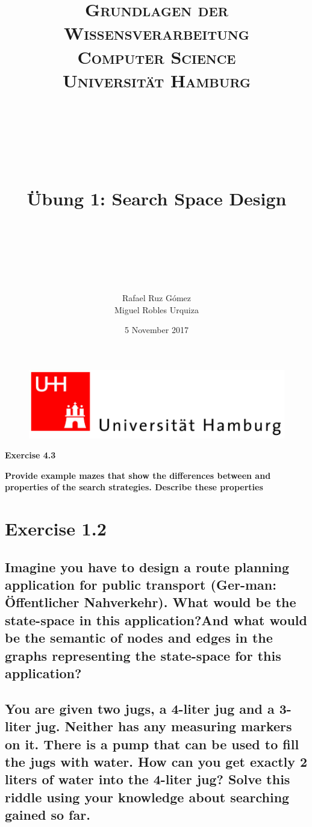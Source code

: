\documentclass[paper=a4, fontsize=11pt]{scrartcl} %
\title{	
\normalfont \normalsize 
\textsc{\textbf{Grundlagen der Wissensverarbeitung} \\ Computer Science \\ Universität Hamburg} \\ [25pt] %
~\\
~\\
~\\
\horrule{0.5pt} \\[0.4cm] %
\Huge Übung 1: Search Space Design \\ %
\horrule{2pt} \\[0.5cm] %
~\\
~\\
}
\author{Rafael Ruz Gómez\\Miguel Robles Urquiza} %
\date{\normalsize 5 November 2017} %
\numberwithin{equation}{section} %
\numberwithin{figure}{section} %
\numberwithin{table}{section} %
\begin{document}
\maketitle %

\begin{figure}
	\centering
	\includegraphics[scale=0.8]{logo_uni_hamburg.png}
\end{figure}

\newpage %





\huge{ \textbf{Exercise 4.3}}
\newline

\large{\textbf{Provide example mazes that show the differences between and properties of the search strategies. Describe these properties}}



\newpage




\section{Exercise 1.2}


\subsection{Imagine you have to design a route planning application for public transport (Ger-man: Öffentlicher Nahverkehr). What would be the state-space in this application?And what would be the semantic of nodes and edges in the graphs representing the state-space for this application?}

\newpage

\subsection{You are given two jugs, a 4-liter jug and a 3-liter jug. Neither has any measuring markers on it. There is a pump that can be used to fill the jugs with water. How can you get exactly 2 liters of water into the 4-liter jug? Solve this riddle using your knowledge about searching gained so far.}
\end{document}
